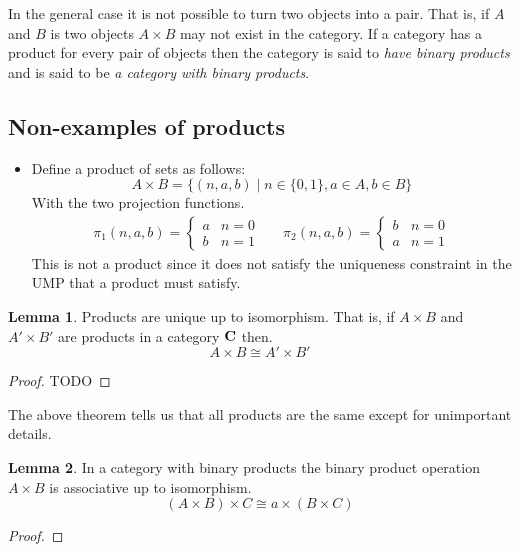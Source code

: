 \documentclass{book}
\theoremstyle{definition}
\newtheorem{lemma}{Lemma}
\begin{document}
In the general case it is not possible to turn two objects into a pair. That is,
if $A$ and $B$ is two objects $A \times B$ may not exist in the category. If a
category has a product for every pair of objects then the category is said to
\emph{have binary products} and is said to be \emph{a category with binary
  products}.

\subsection{Non-examples of products}

\begin{itemize}
\item Define a product of sets as follows:
  \[ A \times B = \{ (n, a, b) \mid n \in \{ 0, 1 \}, a \in A, b \in B \}\]
  With the two projection functions.
  \begin{align*}
    \pi_1(n, a, b) = \begin{cases} a & n = 0 \\ b & n = 1 \end{cases} &&
    \pi_2(n, a, b) = \begin{cases} b & n = 0 \\ a & n = 1 \end{cases}
  \end{align*}
  This is not a product since it does not satisfy the uniqueness constraint in
  the UMP that a product must satisfy.
\end{itemize}

\begin{lemma}
  Products are unique up to isomorphism. That is, if $A \times B$ and $A' \times
  B'$ are products in a category $\bf{C}$ then.
  $$
  A \times B \cong A' \times B'
  $$
\end{lemma}
\begin{proof}
  TODO
\end{proof}

The above theorem tells us that all products are the same except for unimportant
details.

\begin{lemma}
  In a category with binary products the binary product operation $A \times B$
  is associative up to isomorphism.
  \[
    (A \times B) \times C \cong a \times (B \times C)
  \]
\end{lemma}
\begin{proof}

\end{proof}
\end{document}
